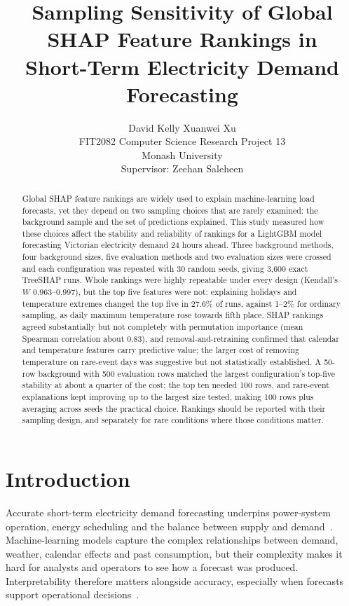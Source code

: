 \documentclass[11pt,a4paper]{article}
\title{Sampling Sensitivity of Global SHAP Feature Rankings in\\Short-Term Electricity Demand Forecasting}
\author{David Kelly \qquad Xuanwei Xu\\[6pt]
  \small FIT2082 Computer Science Research Project 13\\
  \small Monash University\\[2pt]
  \small Supervisor: Zeehan Saleheen}
\date{}
\begin{document}
\maketitle


\begin{abstract}
Global SHAP feature rankings are widely used to explain machine-learning load forecasts, yet they depend on two sampling choices that are rarely examined: the background sample and the set of predictions explained. This study measured how these choices affect the stability and reliability of rankings for a LightGBM model forecasting Victorian electricity demand 24 hours ahead. Three background methods, four background sizes, five evaluation methods and two evaluation sizes were crossed and each configuration was repeated with 30 random seeds, giving 3{,}600 exact TreeSHAP runs. Whole rankings were highly repeatable under every design (Kendall's $W$ 0.963--0.997), but the top five features were not: explaining holidays and temperature extremes changed the top five in 27.6\% of runs, against 1--2\% for ordinary sampling, as daily maximum temperature rose towards fifth place. SHAP rankings agreed substantially but not completely with permutation importance (mean Spearman correlation about 0.83), and removal-and-retraining confirmed that calendar and temperature features carry predictive value; the larger cost of removing temperature on rare-event days was suggestive but not statistically established. A 50-row background with 500 evaluation rows matched the largest configuration's top-five stability at about a quarter of the cost; the top ten needed 100 rows, and rare-event explanations kept improving up to the largest size tested, making 100 rows plus averaging across seeds the practical choice. Rankings should be reported with their sampling design, and separately for rare conditions where those conditions matter.
\end{abstract}

\section{Introduction}

Accurate short-term electricity demand forecasting underpins power-system operation, energy scheduling and the balance between supply and demand~\cite{pinheiro2023}. Machine-learning models capture the complex relationships between demand, weather, calendar effects and past consumption, but their complexity makes it hard for analysts and operators to see how a forecast was produced. Interpretability therefore matters alongside accuracy, especially when forecasts support operational decisions~\cite{baur2024}.
\end{document}

